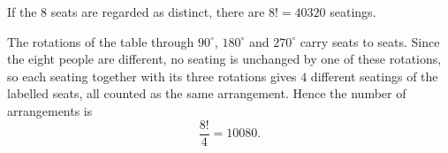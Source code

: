 If the $8$ seats are regarded as distinct, there are $8!=40320$ seatings.

The rotations of the table through $90^\circ$, $180^\circ$ and $270^\circ$ carry seats to seats. Since the eight people are different, no seating is unchanged by one of these rotations, so each seating together with its three rotations gives $4$ different seatings of the labelled seats, all counted as the same arrangement. Hence the number of arrangements is
\[\dfrac{8!}{4}=\boxed{10080}.\]
